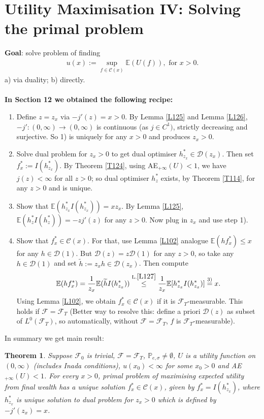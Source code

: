 \documentclass[12pt,a4paper, twoside]{article}
\newtheorem{thm}{Theorem}[section]
\theoremstyle{definition}
\newcommand{\EE}{\mathbb{E}} %
\newcommand{\PP}{\mathbb{P}} %
\begin{document}
\section{Utility Maximisation IV: Solving the primal problem}
\textbf{Goal}: solve problem of finding 
\begin{align*}
u(x):= \sup_{f \in \mathcal{C}(x)} \EE(U(f)), \text{ for } x>0.
\end{align*}
a) via duality; b) directly. \\
\\
\textbf{In Section 12 we obtained the following recipe:}
\begin{enumerate}
\item Define $z=z_x$ via $-j'(z)=x>0$. By Lemma \ref{L125} and Lemma \ref{L126}, $-j':(0,  \infty) \to (0,  \infty)$ is continuous (as $j \in C^1)$, strictly decreasing and surjective. So 1) is uniquely for any $x>0$ and produces $z_x>0$.
\item Solve dual problem for $z_x>0$ to get dual optimiser $h_{z_x}^* \in \mathcal{D}(z_x)$. Then set $f_x^*:= I(h_{z_x}^*)$. By Theorem \ref{T124}, using AE$_{+ \infty}(U) <1$, we have $j(z) < \infty$ for all $z>0$; so dual optimiser $h_z^*$ exists, by Theorem \ref{T114}, for any $z>0$ and is unique. 
\item Show that $\EE(h_{z_x}^*I(h_{z_x}^*)) = xz_x$. By Lemma \ref{L125}, $\EE(h_z^*I(h_z^*))=-zj'(z)$ for any $z>0$. Now plug in $z_x$ and use step 1). 
\item Show that $f_x^* \in \mathcal{C}(x)$. For that, use Lemma \ref{L102} analogue $\EE(hf_x^*) \leq x$ for any $h \in \mathcal{D}(1)$. But $\mathcal{D}(z)=z \mathcal{D}(1)$ for any $z>0$, so take any $h \in \mathcal{D}(1)$ and set $\widetilde{h}:= z_xh \in \mathcal{D}(z_x)$. Then compute
\begin{align*}
\EE(h f_x^*) = \frac{1}{z_x} \EE(\widetilde{h} I(h_{z_x}^*)) \overset{\text{L.} \ref{L127}}\leq \frac{1}{z_x} \EE[ h_{z_x}^* I(h_{z_x}^*)] \overset{3)}=x.
\end{align*}
Using Lemma \ref{L102}, we obtain $f_x^* \in \mathcal{C}(x)$ if it is $\mathcal{F}_T$-measurable. This holds if $\mathcal{F}= \mathcal{F}_T$ (Better way to resolve this: define a priori $\mathcal{D}(z)$ as subset of $L^0( \mathcal{F}_T)$, so automatically, without $\mathcal{F}= \mathcal{F}_T$, $f$ is $\mathcal{F}_T$-measurable). 
\end{enumerate}
In summary we get main result:
\begin{thm} \label{T131} Suppose $\mathcal{F}_0$ is trivial, $\mathcal{F}= \mathcal{F}_T$, $\PP_{e, \sigma} \neq \emptyset$, $U$ is a utility function on $(0, \infty)$ (includes Inada conditions), $u(x_0) < \infty$ for some $x_0 >0$ and AE$_{+ \infty}(U) <1$. For every $x>0$, primal problem of maximising expected utility from final wealth has a unique solution $f_x^* \in \mathcal{C}(x)$, given by $f_x^*=I(h_{z_x}^*)$, where $h_{z_x}^*$ is unique solution to dual problem for $z_x>0$ which is defined by $-j'(z_x)=x$. 
\end{thm}
\end{document}
